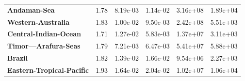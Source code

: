 \begin{table}[H]
{\begin{tabular}{llllll}
            \\
            \textbf{Andaman-Sea}                                & 1.78
                                                                & 8.19e-03
                                                                & 1.14e-02
                                                                & 3.16e+08
                                                                & 1.89e+04
            \\
            \textbf{Western-Australia}                          & 1.83
                                                                & 1.00e-02
                                                                & 9.50e-03
                                                                & 2.42e+08
                                                                & 5.51e+03
            \\
            \textbf{Central-Indian-Ocean}                       & 1.71
                                                                & 1.27e-02
                                                                & 5.83e-03
                                                                & 1.37e+07
                                                                & 3.11e+03
            \\
            \textbf{Timor---Arafura-Seas}                       & 1.79
                                                                & 7.21e-03
                                                                & 6.47e-03
                                                                & 5.41e+07
                                                                & 5.88e+03
            \\
            \textbf{Brazil}                                     & 1.82
                                                                & 1.39e-02
                                                                & 1.66e-02
                                                                & 9.54e+06
                                                                & 2.27e+03
            \\
            \textbf{Eastern-Tropical-Pacific}                   & 1.93
                                                                & 1.64e-02
                                                                & 2.04e-02
                                                                & 1.02e+07
                                                                & 1.06e+04
            \\

\end{tabular}}
\end{table}
